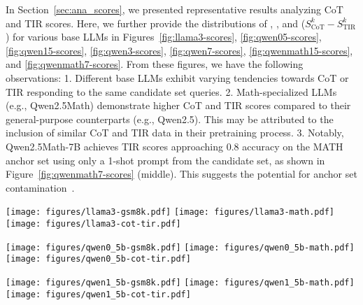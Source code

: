 In Section~\ref{sec:ana_scores}, we presented representative results analyzing CoT and TIR scores. 
Here, we further provide the distributions of {\scote}, {\stire}, and ($S_{\text{CoT}}^k - S_{\text{TIR}}^k$) for various base LLMs in Figures~\ref{fig:llama3-scores}, \ref{fig:qwen05-scores}, \ref{fig:qwen15-scores}, \ref{fig:qwen3-scores}, \ref{fig:qwen7-scores}, \ref{fig:qwenmath15-scores}, and \ref{fig:qwenmath7-scores}.
From these figures, we have the following observations:  
1. Different base LLMs exhibit varying tendencies towards CoT or TIR responding to the same candidate set queries.  
2. Math-specialized LLMs (e.g., Qwen2.5Math) demonstrate higher CoT and TIR scores compared to their general-purpose counterparts (e.g., Qwen2.5). 
This may be attributed to the inclusion of similar CoT and TIR data in their pretraining process.  
3. Notably, Qwen2.5Math-7B achieves TIR scores approaching 0.8 accuracy on the MATH anchor set using only a 1-shot prompt from the candidate set, as shown in Figure~\ref{fig:qwenmath7-scores} (middle). 
This suggests the potential for anchor set contamination~\citep{benbench2024xu}.  


\begin{figure*}
    \centering
    \texttt{[image: figures/llama3-gsm8k.pdf]}
    \texttt{[image: figures/llama3-math.pdf]}
    \texttt{[image: figures/llama3-cot-tir.pdf]}
    \caption{The distribution of {\scote} (left), {\stire} (middle), and ($S_{\text{CoT}}^k - S_{\text{TIR}}^k$) (right) for LLaMA-3-8B.}
    \label{fig:llama3-scores}
\end{figure*}

\begin{figure*}
    \centering
    \texttt{[image: figures/qwen0\_5b-gsm8k.pdf]}
    \texttt{[image: figures/qwen0\_5b-math.pdf]}
    \texttt{[image: figures/qwen0\_5b-cot-tir.pdf]}
    \caption{The distribution of {\scote} (left), {\stire} (middle), and ($S_{\text{CoT}}^k - S_{\text{TIR}}^k$) (right) for Qwen2.5-0.5B.}
    \label{fig:qwen05-scores}
\end{figure*}

\begin{figure*}
    \centering
    \texttt{[image: figures/qwen1\_5b-gsm8k.pdf]}
    \texttt{[image: figures/qwen1\_5b-math.pdf]}
    \texttt{[image: figures/qwen1\_5b-cot-tir.pdf]}
    \caption{The distribution of {\scote} (left), {\stire} (middle), and ($S_{\text{CoT}}^k - S_{\text{TIR}}^k$) (right) for Qwen2.5-1.5B.}
    \label{fig:qwen15-scores}
\end{figure*}

